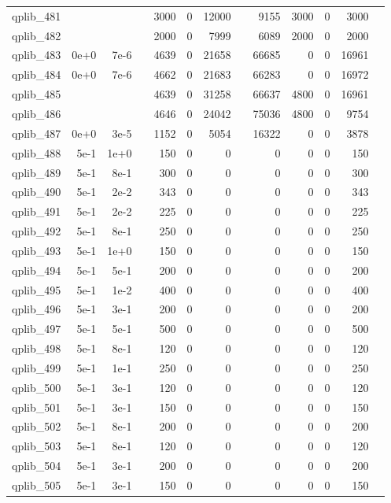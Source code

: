 \begin{table}
\begin{tabular}{lrrrrrrrrrrrr}
qplib\_481	&		&		&	&	3000	&	0	&	12000	&	&	9155	&	3000	&	0	&	3000	\\
qplib\_482	&		&		&	&	2000	&	0	&	7999	&	&	6089	&	2000	&	0	&	2000	\\
qplib\_483	&	0e+0	&	7e-6	&	&	4639	&	0	&	21658	&	&	66685	&	0	&	0	&	16961	\\
qplib\_484	&	0e+0	&	7e-6	&	&	4662	&	0	&	21683	&	&	66283	&	0	&	0	&	16972	\\
qplib\_485	&		&		&	&	4639	&	0	&	31258	&	&	66637	&	4800	&	0	&	16961	\\
qplib\_486	&		&		&	&	4646	&	0	&	24042	&	&	75036	&	4800	&	0	&	9754	\\
qplib\_487	&	0e+0	&	3e-5	&	&	1152	&	0	&	5054	&	&	16322	&	0	&	0	&	3878	\\
qplib\_488	&	5e-1	&	1e+0	&	&	150	&	0	&	0	&	&	0	&	0	&	0	&	150	\\
qplib\_489	&	5e-1	&	8e-1	&	&	300	&	0	&	0	&	&	0	&	0	&	0	&	300	\\
qplib\_490	&	5e-1	&	2e-2	&	&	343	&	0	&	0	&	&	0	&	0	&	0	&	343	\\
qplib\_491	&	5e-1	&	2e-2	&	&	225	&	0	&	0	&	&	0	&	0	&	0	&	225	\\
qplib\_492	&	5e-1	&	8e-1	&	&	250	&	0	&	0	&	&	0	&	0	&	0	&	250	\\
qplib\_493	&	5e-1	&	1e+0	&	&	150	&	0	&	0	&	&	0	&	0	&	0	&	150	\\
qplib\_494	&	5e-1	&	5e-1	&	&	200	&	0	&	0	&	&	0	&	0	&	0	&	200	\\
qplib\_495	&	5e-1	&	1e-2	&	&	400	&	0	&	0	&	&	0	&	0	&	0	&	400	\\
qplib\_496	&	5e-1	&	3e-1	&	&	200	&	0	&	0	&	&	0	&	0	&	0	&	200	\\
qplib\_497	&	5e-1	&	5e-1	&	&	500	&	0	&	0	&	&	0	&	0	&	0	&	500	\\
qplib\_498	&	5e-1	&	8e-1	&	&	120	&	0	&	0	&	&	0	&	0	&	0	&	120	\\
qplib\_499	&	5e-1	&	1e-1	&	&	250	&	0	&	0	&	&	0	&	0	&	0	&	250	\\
qplib\_500	&	5e-1	&	3e-1	&	&	120	&	0	&	0	&	&	0	&	0	&	0	&	120	\\
qplib\_501	&	5e-1	&	3e-1	&	&	150	&	0	&	0	&	&	0	&	0	&	0	&	150	\\
qplib\_502	&	5e-1	&	8e-1	&	&	200	&	0	&	0	&	&	0	&	0	&	0	&	200	\\
qplib\_503	&	5e-1	&	8e-1	&	&	120	&	0	&	0	&	&	0	&	0	&	0	&	120	\\
qplib\_504	&	5e-1	&	3e-1	&	&	200	&	0	&	0	&	&	0	&	0	&	0	&	200	\\
qplib\_505	&	5e-1	&	3e-1	&	&	150	&	0	&	0	&	&	0	&	0	&	0	&	150	\\

\end{tabular}
\end{table}
